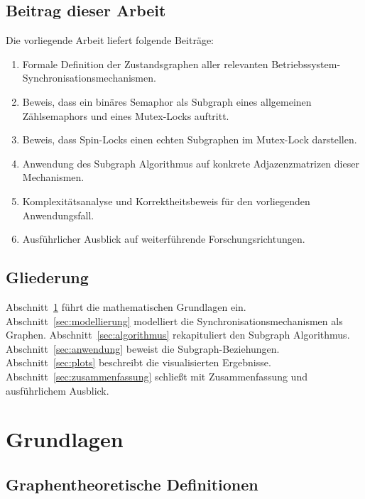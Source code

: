 ﻿\documentclass[a4paper,12pt]{article}
\theoremstyle{definition}
\begin{document}
\subsection{Beitrag dieser Arbeit}

Die vorliegende Arbeit liefert folgende Beiträge:

\begin{enumerate}
  \item Formale Definition der Zustandsgraphen aller relevanten
        Betriebssystem-Synchronisa\-tionsmechanismen.
  \item Beweis, dass ein binäres Semaphor als Subgraph eines allgemeinen
        Zählsemaphors und eines Mutex-Locks auftritt.
  \item Beweis, dass Spin-Locks einen echten Subgraphen im Mutex-Lock
        darstellen.
  \item Anwendung des Subgraph Algorithmus auf konkrete Adjazenzmatrizen
        dieser Mechanismen.
  \item Komplexitätsanalyse und Korrektheitsbeweis für den vorliegenden
        Anwendungsfall.
  \item Ausführlicher Ausblick auf weiterführende Forschungsrichtungen.
\end{enumerate}

\subsection{Gliederung}

Abschnitt~\ref{sec:grundlagen} führt die mathematischen Grundlagen ein.
Abschnitt~\ref{sec:modellierung} modelliert die Synchronisations\-mechanismen
als Graphen. Abschnitt~\ref{sec:algorithmus} rekapituliert den Subgraph
Algorithmus. Abschnitt~\ref{sec:anwendung} beweist die Subgraph-Beziehungen.
Abschnitt~\ref{sec:plots} beschreibt die visualisierten Ergebnisse.
Abschnitt~\ref{sec:zusammenfassung} schließt mit Zusammenfassung und
ausführlichem Ausblick.

\section{Grundlagen}
\label{sec:grundlagen}

\subsection{Graphentheoretische Definitionen}
\end{document}
